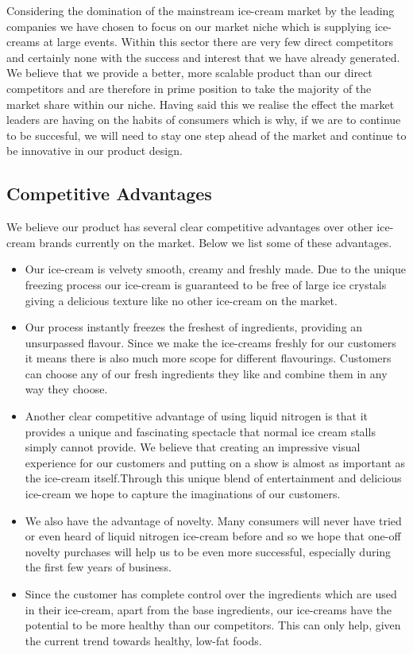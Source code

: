 \documentclass{article}
\begin{document}
  Considering the domination of the mainstream ice-cream market by the leading companies we have chosen to focus on our market niche which is supplying ice-creams at large events. Within this sector there are very few direct competitors and certainly none with the success and interest that we have already generated. We believe that we provide a better, more scalable product than our direct competitors and are therefore in prime position to take the majority of the market share within our niche. Having said this we realise the effect the market leaders are having on the habits of consumers which is why, if we are to continue to be succesful, we will need to stay one step ahead of the market and continue to be innovative in our product design.

\subsection{Competitive Advantages}

  We believe our product has several clear competitive advantages over other ice-cream brands currently on the market. Below we list some of these advantages.

  \begin{itemize}
  \item Our ice-cream is velvety smooth, creamy and freshly made. Due to the unique freezing process our ice-cream is guaranteed to be free of large ice crystals giving a delicious texture like no other ice-cream on the market.

  \item Our process instantly freezes the freshest of ingredients, providing an unsurpassed flavour. Since we make the ice-creams freshly for our customers it means there is also much more scope for different flavourings. Customers can choose any of our fresh ingredients they like and combine them in any way they choose.

  \item Another clear competitive advantage of using liquid nitrogen is that it provides a unique and fascinating spectacle that normal ice cream stalls simply cannot provide. We believe that creating an impressive visual experience for our customers and putting on a show is almost as important as the ice-cream itself.Through this unique blend of entertainment and delicious ice-cream we hope to capture the imaginations of our customers.

  \item We also have the advantage of novelty. Many consumers will never have tried or even heard of liquid nitrogen ice-cream before and so we hope that one-off novelty purchases will help us to be even more successful, especially during the first few years of business.

  \item Since the customer has complete control over the ingredients which are used in their ice-cream, apart from the base ingredients, our ice-creams have the potential to be more healthy than our competitors. This can only help, given the current trend towards healthy, low-fat foods.
  \end{itemize}
\end{document}
